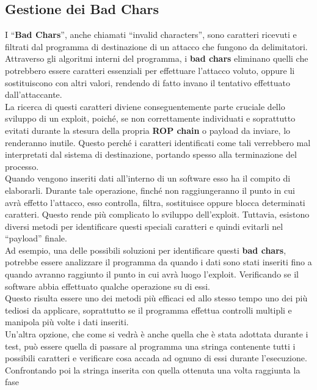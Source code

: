 \subsection*{Gestione dei Bad Chars}
\label{subsec:Badchars}
I ``\textbf{Bad Chars}'', anche chiamati ``invalid characters'', sono caratteri ricevuti e filtrati dal programma di destinazione di un attacco che fungono da delimitatori.\\
Attraverso gli algoritmi interni del programma, i \textbf{bad chars} eliminano quelli che potrebbero essere caratteri essenziali per effettuare l'attacco voluto, oppure li sostituiscono con altri valori, rendendo di fatto invano il tentativo effettuato dall'attaccante.\\
La ricerca di questi caratteri diviene conseguentemente parte cruciale dello sviluppo di un exploit, poiché, se non correttamente individuati e soprattutto evitati durante la stesura della propria \textbf{ROP chain} o payload da inviare, lo renderanno inutile. Questo perché i caratteri identificati come 
tali verrebbero mal interpretati dal sistema di destinazione, portando spesso alla terminazione del processo.\\
Quando vengono inseriti dati all'interno di un software esso ha il compito di elaborarli. Durante tale operazione, finché non raggiungeranno il punto in cui avrà effetto l'attacco, esso controlla, filtra, sostituisce oppure blocca determinati caratteri. Questo rende più complicato lo sviluppo dell'exploit. Tuttavia, esistono diversi 
metodi per identificare questi speciali caratteri e quindi evitarli nel ``payload'' finale.\\
Ad esempio, una delle possibili soluzioni per identificare questi \textbf{bad chars}, potrebbe essere analizzare il programma da quando i dati sono stati inseriti fino a quando avranno raggiunto il punto in cui avrà luogo l'exploit. Verificando se il software abbia effettuato qualche operazione su di essi.\\ 
Questo risulta essere uno dei metodi più efficaci ed allo stesso tempo uno dei più tediosi da applicare, soprattutto se il programma effettua controlli multipli e manipola più volte i dati inseriti. \cite*{Badchars}\\
Un'altra opzione, che come si vedrà è anche quella che è stata adottata durante i test, può essere quella di passare al programma una stringa contenente tutti i possibili caratteri e verificare cosa accada ad ognuno di essi durante l'esecuzione. Confrontando poi la stringa inserita con quella ottenuta una volta raggiunta la fase 
